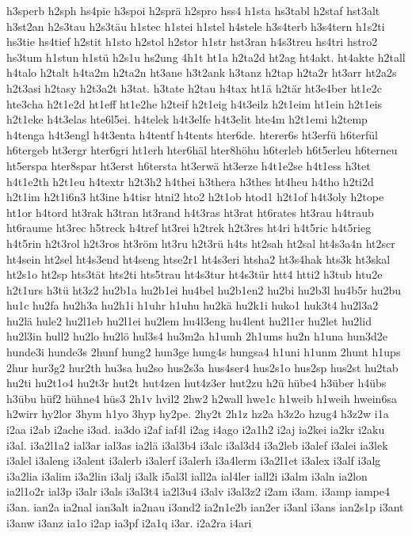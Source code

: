 {h3sperb
h2sph
hs4pie
h3spoi
h2sprä
h2spro
hss4
h1sta
hs3tabl
h2staf
hst3alt
h3st2an
h2s3tau
h2s3täu
h1stec
h1stei
h1stel
h4stele
h3s4terb
h3s4tern
h1s2ti
hs3tie
hs4tief
h2stit
h1sto
h2stol
h2stor
h1str
hst3ran
h4s3treu
hs4tri
hstro2
hs3tum
h1stun
h1stü
h2s1u
hs2ung
4h1t
ht1a
h2ta2d
ht2ag
ht4akt.
ht4akte
h2tall
h4talo
h2talt
h4ta2m
h2ta2n
ht3ane
h3t2ank
h3tanz
h2tap
h2ta2r
ht3arr
ht2a2s
h2t3asi
h2tasy
h2t3a2t
h3tat.
h3tate
h2tau
h4tax
ht1ä
h2tär
ht3e4ber
ht1e2c
hte3cha
h2t1e2d
ht1eff
ht1e2he
h2teif
h2t1eig
h4t3eilz
h2t1eim
ht1ein
h2t1eis
h2t1eke
h4t3elas
hte6l5ei.
h4telek
h4t3elfe
h4t3elit
hte4m
h2t1emi
h2temp
h4tenga
h4t3engl
h4t3enta
h4tentf
h4tents
hter6de.
hterer6s
ht3erfü
h6terfül
h6tergeb
ht3ergr
hter6gri
ht1erh
hter6häl
hter8höhu
h6terleb
h6t5erleu
h6terneu
ht5erspa
hter8spar
ht3erst
h6tersta
ht3erwä
ht3erze
h4t1e2se
h4t1ess
h3tet
h4t1e2th
h2t1eu
h4textr
h2t3h2
h4thei
h3thera
h3thes
ht4heu
h4tho
h2ti2d
h2t1im
h2t1i6n3
ht3ine
h4tisr
htni2
hto2
h2t1ob
htod1
h2t1of
h4t3oly
h2tope
ht1or
h4tord
ht3rak
h3tran
ht3rand
h4t3ras
ht3rat
ht6rates
ht3rau
h4traub
ht6raume
ht3rec
h5treck
h4tref
ht3rei
h2trek
h2t3res
ht4ri
h4t5ric
h4t5rieg
h4t5rin
h2t3rol
h2t3ros
ht3röm
ht3ru
h2t3rü
h4ts
ht2sah
ht2sal
ht4s3a4n
ht2scr
ht4sein
ht2sel
ht4s3end
ht4seng
htse2r1
ht4s3eri
htsha2
ht3s4hak
hts3k
ht3skal
ht2s1o
ht2sp
hts3tät
hts2ti
hts5trau
ht4s3tur
ht4s3tür
htt4
htti2
h3tub
htu2e
h2t1urs
h3tü
ht3z2
hu2b1a
hu2b1ei
hu4bel
hu2b1en2
hu2bi
hu2b3l
hu4b5r
hu2bu
hu1c
hu2fa
hu2h3a
hu2h1i
h1uhr
h1uhu
hu2kä
hu2k1i
huko1
huk3t4
hu2l3a2
hu2lä
hule2
hu2l1eb
hu2l1ei
hu2lem
hu4l3eng
hu4lent
hu2l1er
hu2let
hu2lid
hu2l3in
hull2
hu2lo
hu2lö
hul3s4
hu3m2a
h1umh
2h1ums
hu2n
h1una
hun3d2e
hunde3i
hunde3s
2hunf
hung2
hun3ge
hung4s
hungsa4
h1uni
h1unm
2hunt
h1ups
2hur
hur3g2
hur2th
hu3sa
hu2so
hus2s3a
hus4ser4
hus2s1o
hus2sp
hus2st
hu2tab
hu2ti
hu2t1o4
hu2t3r
hut2t
hut4zen
hut4z3er
hut2zu
h2ü
hübe4
h3über
h4übs
h3übu
hüf2
hühne4
hüs3
2h1v
hvil2
2hw2
h2wall
hwe1c
h1weib
h1weih
hwein6sa
h2wirr
hy2lor
3hym
h1yo
3hyp
hy2pe.
2hy2t
2h1z
hz2a
h3z2o
hzug4
h3z2w
i1a
i2aa
i2ab
i2ache
i3ad.
ia3do
i2af
iaf4l
i2ag
i4ago
i2a1h2
i2aj
ia2kei
ia2kr
i2aku
i3al.
i3a2l1a2
ial3ar
ial3as
ia2lä
i3al3b4
i3alc
i3al3d4
i3a2leb
i3alef
i3alei
ia3lek
i3alel
i3aleng
i3alent
i3alerb
i3alerf
i3alerh
i3a4lerm
i3a2l1et
i3alex
i3alf
i3alg
i3a2lia
i3alim
i3a2lin
i3alj
i3alk
i5al3l
iall2a
ial4ler
iall2i
i3alm
i3aln
ia2lon
ia2l1o2r
ial3p
i3alr
i3als
i3al3t4
ia2l3u4
i3alv
i3al3z2
i2am
i3am.
i3amp
iampe4
i3an.
ian2a
ia2nal
ian3alt
ia2nau
i3and2
ia2n1e2b
ian2er
i3anl
i3ans
ian2s1p
i3ant
i3anw
i3anz
ia1o
i2ap
ia3pf
i2a1q
i3ar.
i2a2ra
i4ari
}

